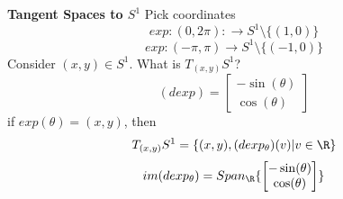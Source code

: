 \begin{example}
  \textbf{Tangent Spaces to $S^1$}
  \newline Pick coordinates
    $$ exp: (0,2\pi): \to S^1\setminus\{(1,0) \}$$
    $$ exp:(-\pi,\pi)\to S^1\setminus\{(-1,0)\} $$
  Consider $(x,y)\in S^1$. What is $T_{(x,y)}S^1$?
    $$(dexp)=
    \begin{bmatrix}
        -\sin(\theta) \\
        \cos(\theta)
    \end{bmatrix}
    $$
    if $exp(\theta)=(x,y)$, then
      $$ T_{(x,y)}S^1= \{(x,y), (dexp_{\theta})(v)|v\in \R \} $$
    $$ im(dexp_{\theta})=Span_{\R}\{\begin{bmatrix}
        -\sin(\theta) \\
        \cos(\theta)
    \end{bmatrix}\} $$
\end{example}
